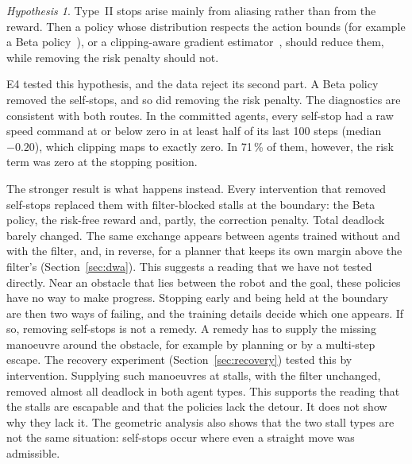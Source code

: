 \documentclass[11pt]{article}
\theoremstyle{definition}
\theoremstyle{remark}
\newtheorem{hypothesis}{Hypothesis}
\begin{document}
\begin{hypothesis}
Type~II stops arise mainly from aliasing rather than from the reward. Then a policy whose distribution respects the action bounds (for example a Beta policy~\cite{chou2017beta}), or a clipping-aware gradient estimator~\cite{fujita2018capg}, should reduce them, while removing the risk penalty should not.
\end{hypothesis}
E4 tested this hypothesis, and the data reject its second part. A Beta policy removed the self-stops, and so did removing the risk penalty. The diagnostics are consistent with both routes. In the committed agents, every self-stop had a raw speed command at or below zero in at least half of its last 100 steps (median $-0.20$), which clipping maps to exactly zero. In 71\,\% of them, however, the risk term was zero at the stopping position.

The stronger result is what happens instead. Every intervention that removed self-stops replaced them with filter-blocked stalls at the boundary: the Beta policy, the risk-free reward and, partly, the correction penalty. Total deadlock barely changed. The same exchange appears between agents trained without and with the filter, and, in reverse, for a planner that keeps its own margin above the filter's (Section~\ref{sec:dwa}). This suggests a reading that we have not tested directly. Near an obstacle that lies between the robot and the goal, these policies have no way to make progress. Stopping early and being held at the boundary are then two ways of failing, and the training details decide which one appears. If so, removing self-stops is not a remedy. A remedy has to supply the missing manoeuvre around the obstacle, for example by planning or by a multi-step escape. The recovery experiment (Section~\ref{sec:recovery}) tested this by intervention. Supplying such manoeuvres at stalls, with the filter unchanged, removed almost all deadlock in both agent types. This supports the reading that the stalls are escapable and that the policies lack the detour. It does not show why they lack it. The geometric analysis also shows that the two stall types are not the same situation: self-stops occur where even a straight move was admissible.
\end{document}
